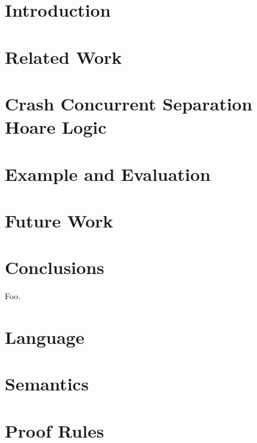 \begin{abstract}
{\it
{}
}
\end{abstract}

\section{Introduction}
\section{Related Work}
\section{Crash Concurrent Separation Hoare Logic}
\section{Example and Evaluation}
\section{Future Work}
\section{Conclusions}

Foo. \cite{foo}

\appendix
\section{Language}
\section{Semantics}
\section{Proof Rules}
